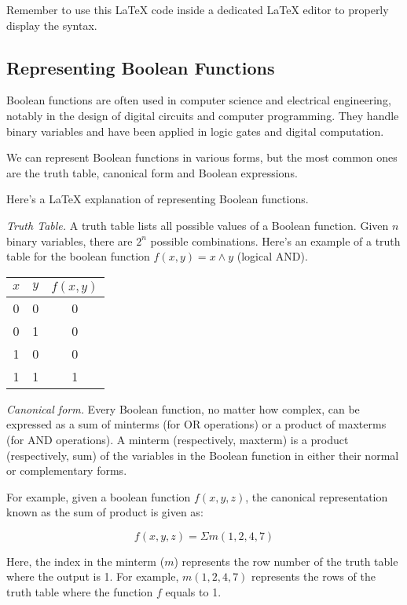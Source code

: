Remember to use this LaTeX code inside a dedicated LaTeX editor to properly display the syntax.

\subsection{Representing Boolean Functions}
Boolean functions are often used in computer science and electrical engineering, notably in the design of digital circuits and computer programming. They handle binary variables and have been applied in logic gates and digital computation.

We can represent Boolean functions in various forms, but the most common ones are the truth table, canonical form and Boolean expressions.

Here's a LaTeX explanation of representing Boolean functions.

{\it Truth Table.} A truth table lists all possible values of a Boolean function. Given $n$ binary variables, there are $2^n$ possible combinations. Here's an example of a truth table for the boolean function $f(x, y) = x \land y$ (logical AND).

\begin{center}
\begin{tabular}{|c|c|c|}
\hline
$x$ & $y$ & $f(x, y)$ \\\hline
0 & 0 & 0 \\\hline
0 & 1 & 0 \\\hline
1 & 0 & 0 \\\hline
1 & 1 & 1 \\\hline
\end{tabular}
\end{center}

{\it Canonical form.} Every Boolean function, no matter how complex, can be expressed as a sum of minterms (for OR operations) or a product of maxterms (for AND operations). A minterm (respectively, maxterm) is a product (respectively, sum) of the variables in the Boolean function in either their normal or complementary forms. 

For example, given a boolean function $f(x, y, z)$, the canonical representation known as the sum of product is given as:

\[f(x, y, z) = \Sigma m(1, 2, 4, 7)\]

Here, the index in the minterm ($m$) represents the row number of the truth table where the output is 1. For example, $m(1, 2, 4, 7)$ represents the rows of the truth table where the function $f$ equals to 1.

